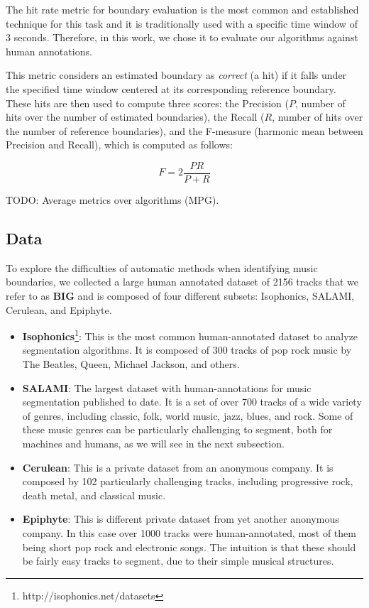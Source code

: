 \documentclass{article}
\begin{document}
The hit rate metric for boundary evaluation is the most common and established technique for this task and it is traditionally used with a specific time window of 3 seconds\cite{Ong2005}. 
Therefore, in this work, we chose it to evaluate our algorithms against human annotations.

This metric considers an estimated boundary as \emph{correct} (a hit) if it falls under the specified time window centered at its corresponding reference boundary.
These hits are then used to compute three scores: the Precision ($P$, number of hits over the number of estimated boundaries), the Recall ($R$, number of hits over the number of reference boundaries), and the F-measure (harmonic mean between Precision and Recall), which is computed as follows:

\begin{equation}\label{eq:fmeasure}
  F = 2 \frac{P R}{P + R}
\end{equation}

TODO: Average metrics over algorithms (MPG).

\subsection{Data}

To explore the difficulties of automatic methods when identifying music boundaries, we collected a large human annotated dataset of 2156 tracks that we refer to as \textbf{BIG} and is composed of four different subsets: Isophonics, SALAMI, Cerulean, and Epiphyte.

\begin{itemize}
  \item
    \textbf{Isophonics}\footnote{http://isophonics.net/datasets}: This is the most common human-annotated dataset to analyze segmentation algorithms. 
    It is composed of 300 tracks of pop rock music by The Beatles, Queen, Michael Jackson, and others.

  \item
    \textbf{SALAMI}\cite{Smith2011}: The largest dataset with human-annotations for music segmentation published to date. 
    It is a set of over 700 tracks of a wide variety of genres, including classic, folk, world music, jazz, blues, and rock.
    Some of these music genres can be particularly challenging to segment, both for machines and humans, as we will see in the next subsection.

  \item
    \textbf{Cerulean}: This is a private dataset from an anonymous company.
    It is composed by 102 particularly challenging tracks, including progressive rock, death metal, and classical music.

  \item
    \textbf{Epiphyte}: This is different private dataset from yet another anonymous company.
    In this case over 1000 tracks were human-annotated, most of them being short pop rock and electronic songs.
    The intuition is that these should be fairly easy tracks to segment, due to their simple musical structures.

\end{itemize}
\end{document}
